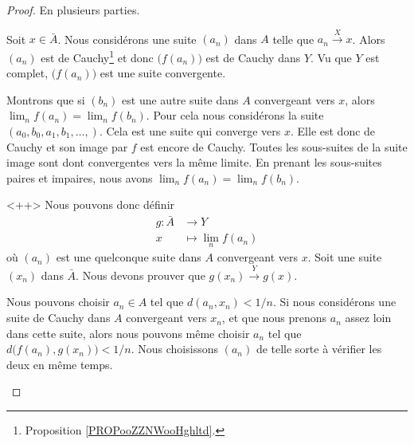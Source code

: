\begin{proof}
    En plusieurs parties.
    \begin{subproof}
         
    Soit \( x\in\bar A\). Nous considérons une suite \( (a_n)\) dans \( A\) telle que \( a_n\stackrel{X}{\longrightarrow}x\). Alors \( (a_n)\) est de Cauchy\footnote{Proposition \ref{PROPooZZNWooHghltd}.} et donc \( \big( f(a_n) \big)\) est de Cauchy dans \( Y\). Vu que \( Y \) est complet, \( \big( f(a_n) \big)\) est une suite convergente.
    \spitem[Indépendance]
     

    Montrons que si \( (b_n)\) est une autre suite dans \( A\) convergeant vers \( x\), alors \( \lim_n f(a_n)=\lim_nf(b_n)\). Pour cela nous considérons la suite\( (a_0,b_0,a_1,b_1,\ldots, )\). Cela est une suite qui converge vers \( x\). Elle est donc de Cauchy et son image par \( f\) est encore de Cauchy. Toutes les sous-suites de la suite image sont dont convergentes vers la même limite. En prenant les sous-suites paires et impaires, nous avons \( \lim_n f(a_n)=\lim_nf(b_n)\).

    \spitem[Définition de \( g\)]
     <++>
    Nous pouvons donc définir
    \begin{equation}
        \begin{aligned}
            g\colon \bar A&\to Y \\
            x&\mapsto \lim_n f(a_n) 
        \end{aligned}
    \end{equation}
    où \( (a_n)\) est une quelconque suite dans \( A\) convergeant vers \( x\).
    Soit une suite \( (x_n)\) dans \( \bar A\). Nous devons prouver que \( g(x_n)\stackrel{Y}{\longrightarrow}g(x)\).

    Nous pouvons choisir \( a_n\in A\) tel que \( d(a_n,x_n)<1/n\). Si nous considérons une suite de Cauchy dans \( A\) convergeant vers \( x_n\), et que nous prenons \( a_n\) assez loin dans cette suite, alors nous pouvons même choisir \( a_n\) tel que \( d\big( f(a_n),g(x_n) \big)<1/n\). Nous choisissons \( (a_n)\) de telle sorte à vérifier les deux en même temps.


\end{subproof}
\end{proof}
